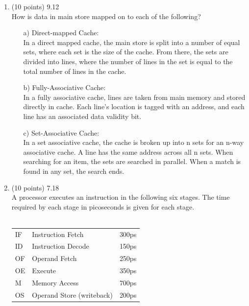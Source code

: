 \documentclass[letterpaper,10pt,onecolumn,titlepage]{article}
\begin{document}
\begin{enumerate}
\item (10 points) 9.12 \\
	How is data in main store mapped on to each of the following?
	\begin{enumerate}
		\item[a)] Direct-mapped Cache: \\
			In a direct mapped cache, the main store is split into a number of
			equal sets, where each set is the size of the cache. From there,
			the sets are divided into lines, where the number of lines in the
			set is equal to the total number of lines in the cache.
		\item[b)] Fully-Associative Cache: \\
			In a fully associative cache, lines are taken from main memory and
			stored directly in cache. Each line's location is tagged with an
			address, and each line has an associated data validity bit.
		\item[c)] Set-Associative Cache: \\
			In a set associative cache, the cache is broken up into n sets for
			an n-way associative cache. A line has the same address across all
			n sets. When searching for an item, the sets are searched in
			parallel. When a match is found in any set, the search ends.
	\end{enumerate}

\item (10 points) 7.18 \\
	A processor executes an instruction in the following six stages. The time required
	by each stage in picoseconds is given for each stage.\\
	\\
	\begin{tabular}{ l l l }
		IF & Instruction Fetch & 300ps \\
		ID & Instruction Decode & 150ps \\
		OF & Operand Fetch & 250ps \\
		OE & Execute & 350ps \\
		 M & Memory Access & 700ps \\
		OS & Operand Store (writeback) & 200ps \\
	\end{tabular} \\


\end{enumerate}
\end{document}
